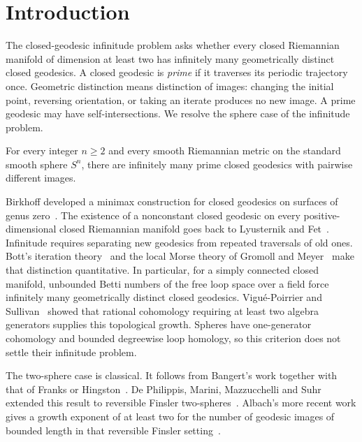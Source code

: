 \section{Introduction}\label{sec:introduction}

The closed-geodesic infinitude problem asks whether every closed Riemannian
manifold of dimension at least two has infinitely many geometrically distinct
closed geodesics. A closed geodesic is \emph{prime} if it traverses its
periodic trajectory once. Geometric distinction means distinction of images:
changing the initial point, reversing orientation, or taking an iterate
produces no new image. A prime geodesic may have self-intersections.
We resolve the sphere case of the infinitude problem.

\begin{theorem}\label{thm:spheres}
For every integer $n\ge2$ and every smooth Riemannian metric on the standard
smooth sphere $S^n$, there are infinitely many prime closed geodesics with
pairwise different images.
\end{theorem}

Birkhoff developed a minimax construction for closed geodesics on surfaces
of genus zero~\cite[Section~17]{Birkhoff1917}.
The existence of a nonconstant closed geodesic on every positive-dimensional
closed Riemannian manifold goes back to Lyusternik and
Fet~\cite{LyusternikFet1951}.
Infinitude requires separating new geodesics from repeated traversals of
old ones. Bott's iteration theory~\cite{Bott1956Iteration} and the local
Morse theory of Gromoll and Meyer~\cite{GromollMeyer1969} make that
distinction quantitative. In particular, for a simply connected closed
manifold, unbounded Betti numbers of the free loop space over a field
force infinitely many geometrically distinct closed geodesics.
Vigu\'e-Poirrier and Sullivan~\cite{ViguePoirrierSullivan1976} showed that
rational cohomology requiring at least two algebra generators supplies
this topological growth. Spheres have one-generator cohomology and bounded
degreewise loop homology, so this criterion does not settle their infinitude
problem.

The two-sphere case is classical. It follows from Bangert's work together
with that of Franks or Hingston~\cite{Bangert1993,Franks1992,Hingston1993}.
De Philippis, Marini,
Mazzucchelli and Suhr extended this result to reversible Finsler
two-spheres~\cite[Theorem 1.5]{DePhilippisMariniMazzucchelliSuhr2022}.
Albach's more recent work gives a growth exponent of at least two for
the number of geodesic images of bounded length in that reversible
Finsler setting~\cite[Theorem 1.1]{Albach2026}.

